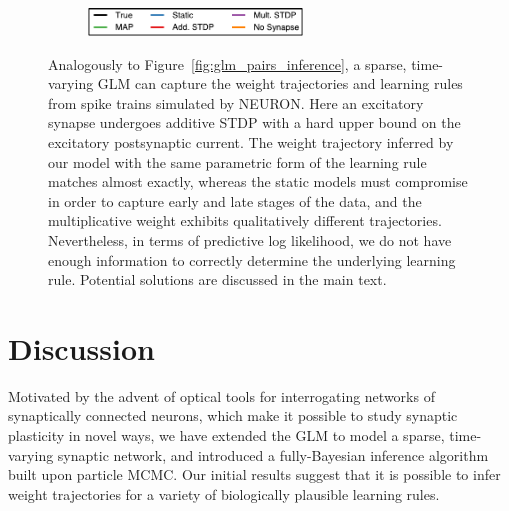\begin{figure}[t]

  \begin{subfigure}[T]{\textwidth}
  \centering
  \includegraphics[height=2em]{figures/ch4/fig4_legend}    
  \end{subfigure}
  \caption{Analogously to Figure~\ref{fig:glm_pairs_inference}, a sparse, time-varying GLM can capture the weight trajectories and learning rules from spike trains simulated by NEURON. Here an excitatory synapse undergoes additive STDP with a hard upper bound on the excitatory postsynaptic current. The weight trajectory inferred by our model with the same parametric form of the learning rule matches almost exactly, whereas the static models must compromise in order to capture early and late stages of the data, and the multiplicative weight exhibits qualitatively different trajectories. Nevertheless, in terms of predictive log likelihood, we do not have enough information to correctly determine the underlying learning rule. Potential solutions are discussed in the main text.}
  \label{fig:pynn_pairs_inference}
  \vspace{-2em}
\end{figure}


\section{Discussion}
Motivated by the advent of optical tools for interrogating networks of synaptically connected neurons, which make it possible to study synaptic plasticity in novel ways, we have extended the GLM to model a sparse, time-varying synaptic network, and introduced a fully-Bayesian inference algorithm built upon particle MCMC. Our initial results suggest that it is possible to infer weight trajectories for a variety of biologically plausible learning rules.

